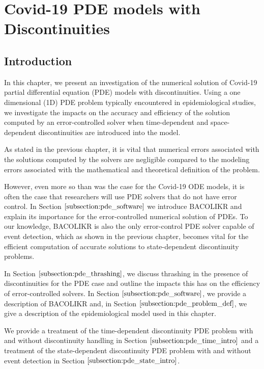 \documentclass{article}
\begin{document}
\section{Covid-19 PDE models with Discontinuities}
\subsection{Introduction}
\label{subsection:pde_intro}
In this chapter, we present an investigation of the numerical solution of Covid-19 partial differential equation (PDE) models with discontinuities. Using a one dimensional (1D) PDE problem typically encountered in epidemiological studies, we investigate the impacts on the accuracy and efficiency of the solution computed by an error-controlled solver when time-dependent and space-dependent discontinuities are introduced into the model.

As stated in the previous chapter, it is vital that numerical errors associated with the solutions computed by the solvers are negligible compared to the modeling errors associated with the mathematical and theoretical definition of the problem.

However, even more so than was the case for the Covid-19 ODE models, it is often the case that researchers will use PDE solvers that do not have error control. In Section $\ref{subsection:pde_software}$ we introduce BACOLIKR and explain its importance for the error-controlled numerical solution of PDEs. To our knowledge, BACOLIKR is also the only error-control PDE solver capable of event detection, which as shown in the previous chapter, becomes vital for the efficient computation of accurate solutions to state-dependent discontinuity problems.

In Section $\ref{subsection:pde_thrashing}$, we discuss thrashing in the presence of discontinuities for the PDE case and outline the impacts this has on the efficiency of error-controlled solvers. In Section $\ref{subsection:pde_software}$, we provide a description of BACOLIKR and, in Section $\ref{subsection:pde_problem_def}$, we give a description of the epidemiological model used in this chapter.

We provide a treatment of the time-dependent discontinuity PDE problem with and without discontinuity handling in Section $\ref{subsection:pde_time_intro}$ and a treatment of the state-dependent discontinuity PDE problem with and without event detection in Section $\ref{subsection:pde_state_intro}$.
\end{document}
